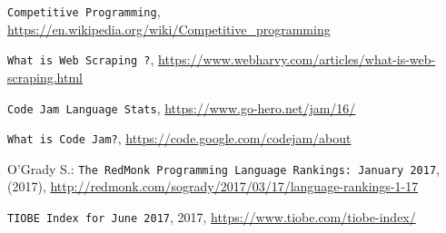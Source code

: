 \documentclass{article}
\begin{document}
\begin{multicols*}{2}
\begin{thebibliography}{1}

\raggedright \texttt{Competitive Programming}, \url{https://en.wikipedia.org/wiki/Competitive_programming}


\raggedright \texttt{What is Web Scraping ?}, \url{https://www.webharvy.com/articles/what-is-web-scraping.html}

\raggedright \texttt{Code Jam Language Stats}, \url{https://www.go-hero.net/jam/16/}

\raggedright \texttt{What is Code Jam?}, \url{https://code.google.com/codejam/about}

\raggedright
O'Grady S.: \texttt{The RedMonk Programming Language Rankings: January 2017}, (2017), \url{http://redmonk.com/sogrady/2017/03/17/language-rankings-1-17}


\raggedright \texttt{TIOBE Index for June 2017}, 2017, \url{https://www.tiobe.com/tiobe-index/}

\end{thebibliography}

\end{multicols*}
\end{document}
